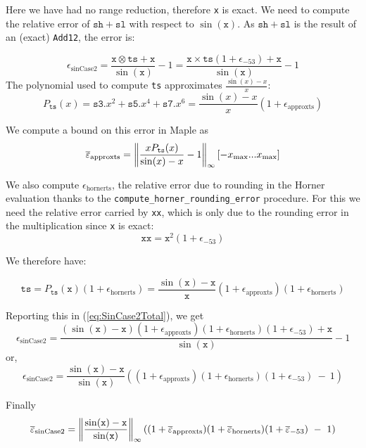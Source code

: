 Here we have had no range reduction, therefore \texttt{x} is exact.
We need to compute the relative error of $\mathtt{sh}+\mathtt{sl}$
with respect to $\sin(\mathtt{x})$. As $\mathtt{sh}+\mathtt{sl}$ is
the result of an (exact) \texttt{Add12}, the error is:

\begin{equation}
  \epsilon_{\mathrm{sinCase2}} = \frac{\mathtt{x}\otimes \mathtt{ts} + \mathtt{x}}{\sin(\mathtt{x})} -1 = \frac{\mathtt{x}\times\mathtt{ts}(1+\epsilon_{-53}) + \mathtt{x}}{\sin(\mathtt{x})} -1
\label{eq:SinCase2Total}
\end{equation}
The polynomial used to compute \texttt{ts}
approximates $\frac{\sin(x)-x}{x}$:
$$
P_{\mathtt{ts}}(x) = \mathtt{s3}.x^2 + \mathtt{s5}.x^4 + \mathtt{s7}.x^6
= \frac{\sin(x)-x}{x}(1+\epsilon_{\mathrm{approxts}})
$$

We compute a bound on this error in Maple as
$${\overline{\varepsilon}}_{\mathrm{approxts}} = \left\Vert \frac{xP_{\mathtt{ts}}(x)}{\sin(x)-x} -1 \right\Vert_{\infty}[-x_{\mathrm{max}}...x_{\mathrm{max}}]$$

We also compute $\epsilon_{\mathrm{hornerts}}$, the relative error due
to rounding in the Horner evaluation thanks to the
\texttt{compute\_horner\_rounding\_error} procedure. For this we need
the relative error carried by \texttt{xx}, which is only due to the
rounding error in the multiplication since \texttt{x} is exact:
$$\mathtt{xx}=\mathtt{x}^2(1+\epsilon_{-53})$$

We therefore have:

$$\mathtt{ts} = P_{\mathtt{ts}}(\mathtt{x})(1+\epsilon_{\mathrm{hornerts}}) = \frac{\sin(\mathtt{x})-\mathtt{x}}{\mathtt{x}}(1+\epsilon_{\mathrm{approxts}})(1+\epsilon_{\mathrm{hornerts}})$$

Reporting this in (\ref{eq:SinCase2Total}), we get
\begin{equation*}
  \epsilon_{\mathrm{sinCase2}} = \frac{(\sin(\mathtt{x})-\mathtt{x})(1+\epsilon_{\mathrm{approxts}})(1+\epsilon_{\mathrm{hornerts}})(1+\epsilon_{-53}) + \mathtt{x}}{\sin(\mathtt{x})} -1
\end{equation*}
or,
\begin{equation*}
  \epsilon_{\mathrm{sinCase2}} =  \frac{\sin(\mathtt{x})-\mathtt{x}}{\sin(\mathtt{x})}\left((1+\epsilon_{\mathrm{approxts}})(1+\epsilon_{\mathrm{hornerts}})(1+\epsilon_{-53})\ -\ 1\right)
\end{equation*}

Finally
\begin{equation}
  \maxeps_{\mathrm{sinCase2}} =  \left\Vert\frac{\sin(\mathtt{x})-\mathtt{x}}{\sin(\mathtt{x})}\right\Vert_{\infty}((1+\maxeps_{\mathrm{approxts}})(1+\maxeps_{\mathrm{hornerts}})(1+\maxeps_{-53})\ -\ 1)
  \label{eq:SinCase2Total2}
\end{equation}




